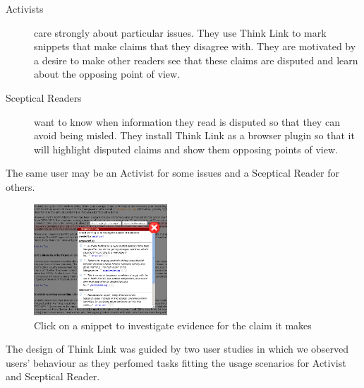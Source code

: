 \documentclass{chi2009}
\newcommand{\todo}[1]{}
\begin{document}
\begin{description}
\item[Activists] care strongly about particular issues. They use Think Link to mark snippets that make claims that they disagree with. They are motivated by a desire to make other readers see that these claims are disputed and learn about the opposing point of view.

\item[Sceptical Readers] want to know when information they read is disputed so that they can avoid being misled. They install Think Link as a browser plugin so that it will highlight disputed claims and show them opposing points of view.
\end{description}

The same user may be an Activist for some issues and a Sceptical Reader for others.

\begin{figure}[tb]
	\begin{center}
	\includegraphics[width=5cm]{../screenshots/v2_popup_dim.png}
	\caption{Click on a snippet to investigate evidence for the claim it makes}
	\label{claimview}
	\end{center}
\end{figure}

\todo{Claim panel should have 'more' buttons}


The design of Think Link was guided by two user studies in which we observed users' behaviour as they perfomed tasks fitting the usage scenarios for Activist and Sceptical Reader.

\todo{Talk about automatically including all arguments from Snopes}
\todo{I think we need to do some kind of evaluation of the new interface, even if it is just showing it to some people, or having people in the lab try it.}
\todo{Need figures saying how efficient it is for an activist user to mark up a topic}

\end{document}
